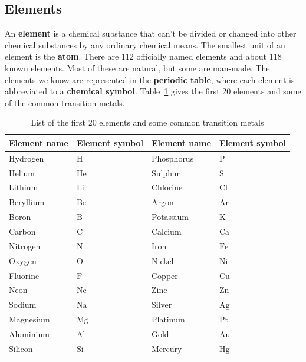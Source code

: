             \subsection*{Elements}
            \nopagebreak
An \textbf{element} is a chemical substance that can't be divided or changed into other chemical substances by any ordinary chemical means. The smallest unit of an element is the \textbf{atom}.
There are 112 officially named elements and about 118 known elements. Most of these are natural, but some are man-made. The elements we know are represented in the \textbf{periodic table}, where each element is abbreviated to a \textbf{chemical symbol}. Table~\ref{tab:elements} gives the first 20 elements and some of the common transition metals.
\begin{table}[H]
\label{tab:elements}
\begin{center}
\begin{tabular}{|l|l|l|l|}\hline
\textbf{Element name} & \textbf{Element symbol} & \textbf{Element name} & \textbf{Element symbol} \\ \hline
Hydrogen & $\text{H}$ & Phosphorus & $\text{P}$  \\ \hline
Helium & $\text{He}$ & Sulphur & $\text{S}$ \\ \hline
Lithium & $\text{Li}$ & Chlorine & $\text{Cl}$ \\ \hline
Beryllium & $\text{Be}$ & Argon & $\text{Ar}$ \\ \hline 
Boron & $\text{B}$ & Potassium & $\text{K}$ \\ \hline
Carbon & $\text{C}$ & Calcium & $\text{Ca}$ \\ \hline 
Nitrogen & $\text{N}$ & Iron & $\text{Fe}$ \\ \hline
Oxygen & $\text{O}$ & Nickel & $\text{Ni}$ \\ \hline 
Fluorine & $\text{F}$ & Copper & $\text{Cu}$ \\ \hline
Neon & $\text{Ne}$  & Zinc & $\text{Zn}$ \\ \hline
Sodium & $\text{Na}$  & Silver & $\text{Ag}$ \\ \hline
Magnesium & $\text{Mg}$  & Platinum & $\text{Pt}$ \\ \hline
Aluminium & $\text{Al}$ & Gold & $\text{Au}$ \\ \hline
Silicon & $\text{Si}$ & Mercury & $\text{Hg}$  \\ \hline
\end{tabular}
\end{center}

\caption{List of the first 20 elements and some common transition metals}
\end{table}

